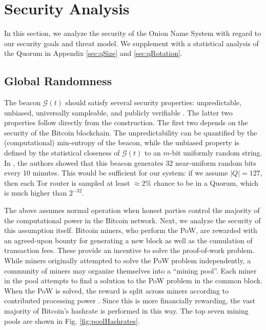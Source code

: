 \documentclass[USenglish,oneside,twocolumn]{article}
\begin{document}

\vspace{-5px}

\section{Security Analysis}
\label{sec:Analysis}

In this section, we analyze the security of the Onion Name System with regard to our security goals and  threat model. We supplement with a statistical analysis of the Quorum in Appendix \ref{sec:qSize} and \ref{sec:qRotation}.

\subsection{Global Randomness}
\label{sec:GlobalRand}

The beacon $ \mathcal{G}(t) $ should satisfy several security properties: unpredictable, unbiased, universally sampleable, and publicly verifiable \cite{BonneauCG15}. The latter two properties follow directly from the construction. The first two depends on the security of the Bitcoin blockchain. The unpredictability can be quantified by the (computational) min-entropy of the beacon, while the unbiased property is defined by the statistical closeness of $ \mathcal{G}(t) $ to an $m$-bit uniformly random string. In \cite{BonneauCG15}, the authors showed that this beacon generates 32 near-uniform random bits every 10 minutes. This would be sufficient for our system: if we assume $ \left\vert{Q}\right\vert = 127 $, then each Tor router is sampled at least  $\approx 2\%$ chance to be in a Quorum, which is much higher than $2^{-32}$.

The above assumes normal operation when honest parties control the majority of the computational power in the Bitcoin network. Next, we analyze the security of this assumption itself. Bitcoin miners, who perform the PoW, are rewarded with an agreed-upon bounty for generating a new block as well as the cumulation of transaction fees. These provide an incentive to solve the proof-of-work problem.  While miners originally attempted to solve the PoW problem independently, a community of miners may organize themselves into a ``mining pool''. Each miner in the pool attempts to find a solution to the PoW problem in the common block. When the PoW is solved, the reward is split across miners according to contributed processing power  \cite{eyal2015miner}. Since this is more financially rewarding, the vast majority of Bitcoin's hashrate is performed in this way. The top seven mining pools are shown in Fig. \ref{fig:poolHashrates}.
\end{document}
